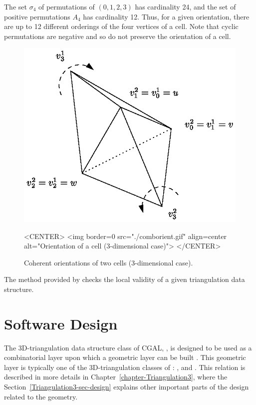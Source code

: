 The set {\Large $\sigma$}$_4$ of permutations of
$(0,1,2,3)$ has cardinality 24, and the set of positive permutations
$A_4$ has cardinality 12. Thus, for a given orientation, there
are up to 12 different orderings of the four vertices of a cell. Note
that cyclic permutations are negative and so do not preserve the
orientation of a cell.

\begin{figure}[htbp]
\begin{ccTexOnly}
\begin{center} 
\includegraphics{comborient.eps} 
\end{center}
\end{ccTexOnly}
\caption{Coherent orientations of two cells (3-dimensional case).
\label{TDS3-fig-comborient}}
\begin{ccHtmlOnly}
<CENTER>
<img border=0 src="./comborient.gif" align=center alt="Orientation of a cell (3-dimensional case)">
</CENTER>
\end{ccHtmlOnly}
\end{figure} 

The  method provided by
 checks the local validity of a
given triangulation data structure.
 
\section{Software Design}
\label{TDS3-sec-design}

The 3D-triangulation data structure class of CGAL,
, is designed to be used as a combinatorial
layer upon which a geometric layer can be built \cite{k-ddsps-98}. This
geometric layer is typically one of the 3D-triangulation classes of \cgal:
,  and
. This relation is described in more details in
Chapter~\ref{chapter-Triangulation3}, where the
Section~\ref{Triangulation3-sec-design} explains other important parts of the
design related to the geometry.

